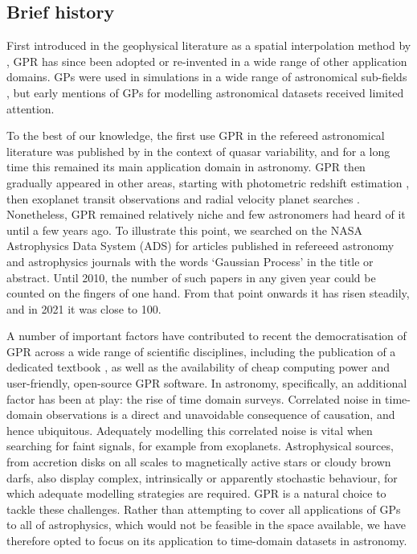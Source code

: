 \documentclass[letterpaper]{ar-1col}
\begin{document}
\subsection{Brief history}

First introduced in the geophysical literature as a spatial interpolation method by \citet{kriging}, GPR has since been adopted or re-invented in a wide range of other application domains. GPs were used in simulations in a wide range of astronomical sub-fields \citep[see e.g.][]{1980asfr.symp..159B,1988JGR....9311569C,1997ApJ...483L...1P}, but early mentions of GPs for modelling astronomical datasets \citep[see e.g.][]{1976MitAG..38..192D,1978A&A....70..777V,1991MGeo...16..313J} received limited attention.

To the best of our knowledge, the first use GPR in the refereed astronomical literature was published by \citet{prh92a} in the context of quasar variability, and for a long time this remained its main application domain in astronomy. GPR then gradually appeared in other areas, starting with photometric redshift estimation \citep{2006ApJ...647..102W}, then exoplanet transit observations \citep{2009ApJ...704...51C,2012MNRAS.419.2683G} and radial velocity planet searches \citep{2012MNRAS.419.3147A,2014MNRAS.443.2517H}. Nonetheless, GPR remained relatively niche and few astronomers had heard of it until a few years ago. To illustrate this point, we searched on the NASA Astrophysics Data System (ADS) for articles published in refereeed astronomy and astrophysics journals with the words `Gaussian Process' in the title or abstract. Until 2010, the number of such papers in any given year could be counted on the fingers of one hand. From that point onwards it has risen steadily, and in 2021 it was close to 100.

A number of important factors have contributed to recent the democratisation of GPR across a wide range of scientific disciplines, including the publication of a dedicated textbook \citep{gpml}, as well as the availability of cheap computing power and user-friendly, open-source GPR software. In astronomy, specifically, an additional factor has been at play: the rise of time domain surveys. Correlated noise in time-domain observations is a direct and unavoidable consequence of causation, and hence ubiquitous. Adequately modelling this correlated noise is vital when searching for faint signals, for example from exoplanets. Astrophysical sources, from accretion disks on all scales to magnetically active stars or cloudy brown darfs, also display complex, intrinsically or apparently stochastic behaviour, for which adequate modelling strategies are required. GPR is a natural choice to tackle these challenges. Rather than attempting to cover all applications of GPs to all of astrophysics, which would not be feasible in the space available, we have therefore opted to focus on its application to time-domain datasets in astronomy.
\end{document}
